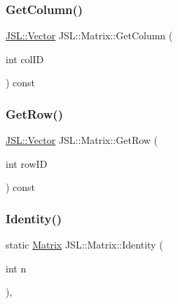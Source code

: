 \mbox{\label{classJSL_1_1Matrix_a11ea58ca43e028123f628966eb4834a0}} 
\subsubsection{\texorpdfstring{Get\+Column()}{GetColumn()}}
{\footnotesize\ttfamily \hyperlink{classJSL_1_1Vector}{J\+S\+L\+::\+Vector} J\+S\+L\+::\+Matrix\+::\+Get\+Column (\begin{DoxyParamCaption}\item[{int}]{col\+ID }\end{DoxyParamCaption}) const\hspace{0.3cm}{\ttfamily [inline]}}

\mbox{\label{classJSL_1_1Matrix_aa8bae8650234f5e5569277563d68f22d}} 
\subsubsection{\texorpdfstring{Get\+Row()}{GetRow()}}
{\footnotesize\ttfamily \hyperlink{classJSL_1_1Vector}{J\+S\+L\+::\+Vector} J\+S\+L\+::\+Matrix\+::\+Get\+Row (\begin{DoxyParamCaption}\item[{int}]{row\+ID }\end{DoxyParamCaption}) const\hspace{0.3cm}{\ttfamily [inline]}}

\mbox{\label{classJSL_1_1Matrix_afd9edd73e5f559eed02b063d4c4e47f8}} 
\subsubsection{\texorpdfstring{Identity()}{Identity()}}
{\footnotesize\ttfamily static \hyperlink{classJSL_1_1Matrix}{Matrix} J\+S\+L\+::\+Matrix\+::\+Identity (\begin{DoxyParamCaption}\item[{int}]{n }\end{DoxyParamCaption})\hspace{0.3cm}{\ttfamily [inline]}, {\ttfamily [static]}}



